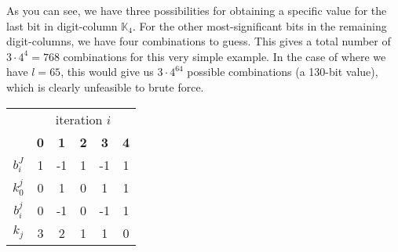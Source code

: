%
As you can see, we have three possibilities for obtaining a specific value for the last bit in digit-column $\mathbb{K}_4$.
For the other most-significant bits in the remaining digit-columns, we have four combinations to guess. This gives a total number of $3 \cdot 4^4 = 768$ combinations for this very simple example. In the case of {\fourq} where we have $l = 65$, this would give us $3 \cdot 4^{64}$ possible combinations (a 130-bit value), which is clearly unfeasible to brute force. 
%
\begin{table}[H]
	\centering
	\begin{tabular}{*6c}
		\toprule 
		& \multicolumn{5}{c}{iteration $i$} \\
		\cline{2-6}
		& \textbf{0} & \textbf{1} & \textbf{2} & \textbf{3} & \textbf{4} \\
		\midrule
		$b_i^J$ & 1 & -1 & 1 & -1 & 1 \\
		$k_0^j$ & 0 & 1 & 0 & 1 & 1 \\
		$b_i^j$ & 0 & -1 & 0 & -1 & 1 \\
		$k_j$ & 3 & 2 & 1 & 1 & 0  \\
		\bottomrule
	\end{tabular}
\end{table}
%
\begin{figure}[H]
	\centering
	\hspace{1cm}
\end{figure}
